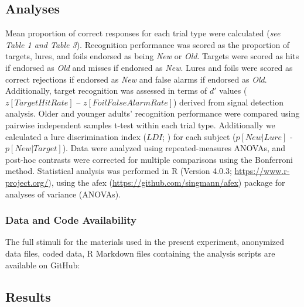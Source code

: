 \documentclass[11pt]{article}
\begin{document}
\subsection*{Analyses}
Mean proportion of correct responses for each trial type were calculated (\textit{see Table 1 and Table 3}). Recognition performance was scored as the proportion of targets, lures, and foils endorsed as being \textit{New} or \textit{Old}. Targets were scored as hits if endorsed as \textit{Old} and misses if endorsed as \textit{New}. Lures and foils were scored as correct rejections if endorsed as \textit{New} and false alarms if endorsed as \textit{Old}. Additionally, target recognition was assessed in terms of $d'$ values ($z[Target Hit Rate]$ – $z[Foil False Alarm Rate]$) derived from signal detection analysis. Older and younger adults’ recognition performance were compared using pairwise independent samples t-test within each trial type. Additionally we calculated a lure discrimination index ($LDI$; \cite{stark_task_2013, stark_mnemonic_2019}) for each subject ($p[New|Lure]$ - $p[New|Target]$). Data were analyzed using repeated-measures ANOVAs, and post-hoc contrasts were corrected for multiple comparisons using the Bonferroni method. Statistical analysis was performed in R (Version 4.0.3; \href{https://www.r-project.org/}{https://www.r-project.org/}), using the afex (\href{https://github.com/singmann/afex}{https://github.com/singmann/afex}) package for analyses of variance (ANOVAs). 

\subsubsection*{Data and Code Availability}
The full stimuli for the materials used in the present experiment, anonymized data files, coded data, R Markdown files containing the analysis scripts are available on GitHub:


\subsection*{Results}
\end{document}
